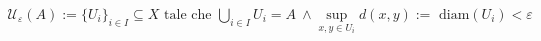 \documentclass[preview]{standalone}
\begin{document}
\begin{align*}
\mathcal{U}_\varepsilon(A) :=  \{U_i\}_{i \in I} \subseteq X \text{  tale che } \bigcup_{i \in I} U_i = A  \ \land \sup_{x,y \in U_i} d(x,y) := \text{ diam}(U_i)< \varepsilon
\end{align*}
\end{document}
